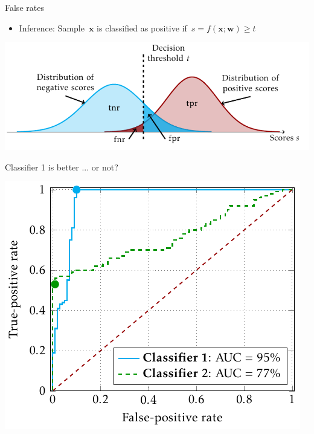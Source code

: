 \documentclass[10pt, aspectratio=169]{beamer}
\begin{document}
\begin{frame}{False rates}
  \begin{itemize}
    \item Inference: Sample~$\bm{x}$ is classified as positive if~$s = f(\bm{x}; \bm{w}) \geq t$
  \end{itemize}
  \begin{center}
    \includegraphics{../images/confusion_rates.pdf}
  \end{center}
\end{frame}

\begin{frame}{Classifier 1 is better ... or not?}
  \begin{center}
    \includegraphics[width=\linewidth, height=0.9\textheight, keepaspectratio]{
      ../images/roc_space_presentation.pdf
    }
  \end{center}
\end{frame}
\end{document}
